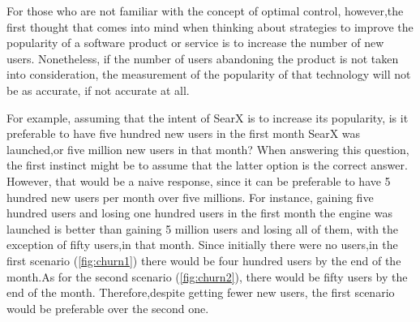 \documentclass{article}
\begin{document}
For‌‌ those ‌‌who‌‌ are‌‌ not ‌‌familiar ‌‌with‌‌ the‌‌ concept‌‌ of‌‌ optimal‌‌ control,‌‌ however,‌‌the‌‌ first ‌‌thought‌‌ that‌‌ comes‌‌ into ‌‌mind‌‌ when‌‌ thinking ‌‌about ‌‌strategies ‌‌to ‌‌improve‌‌ the ‌‌popularity‌‌ of‌‌ a‌‌ software ‌‌product‌‌ or‌ ‌service‌ ‌is‌ ‌to‌ ‌increase‌ ‌the‌ ‌number‌ ‌of‌ ‌new‌ ‌users.‌ ‌Nonetheless,‌ ‌if‌ ‌the‌ ‌number‌ ‌of‌ ‌users‌‌ abandoning‌ ‌the‌ ‌product‌ ‌is‌ ‌not‌ ‌taken‌ ‌into‌ ‌consideration,‌ ‌the‌ ‌measurement‌ ‌of‌ ‌the ‌‌popularity‌‌ of‌‌ that‌ ‌technology‌ ‌will‌ ‌not‌ ‌be‌ ‌as‌ ‌accurate, if‌ ‌not‌ ‌accurate‌ ‌at‌ ‌all.‌‌

For‌ ‌example,‌ ‌assuming‌ ‌that‌ ‌the‌ ‌intent‌ ‌of‌ ‌SearX‌ ‌is‌ ‌to ‌‌increase‌‌ its‌‌ popularity,‌‌ is‌‌ it‌‌ preferable‌‌ to‌‌ have‌‌ five‌‌ hundred‌‌ new‌‌ users‌‌ in‌‌ the‌‌ first‌‌ month‌‌ SearX‌‌ was‌‌ launched,‌‌or‌‌ five‌‌ million‌‌ new‌‌ users‌‌ in‌‌ that‌ ‌month?‌ ‌When‌ ‌answering‌ ‌this‌‌ question, ‌‌the‌‌ first‌‌ instinct‌‌ might‌‌ be‌‌ to‌‌ assume‌‌ that‌‌ the‌‌ latter‌‌ option‌ ‌is‌ ‌the‌ ‌correct‌ ‌answer.‌ ‌However,‌ ‌that‌ ‌would‌ ‌be‌ ‌a‌ ‌naive‌ ‌response,‌ ‌since‌ ‌it‌ ‌can‌ ‌be‌‌ preferable‌‌ to‌‌ have‌‌ 5‌‌ hundred‌‌ new‌‌ users‌‌ per‌‌ month‌‌ over‌‌ five‌‌ millions.‌‌ For‌‌ instance,‌‌ gaining‌‌ five‌‌ hundred‌ ‌users‌ ‌and‌ ‌losing‌ ‌one‌ ‌hundred‌ ‌users‌ ‌in‌ ‌the‌ ‌first‌ ‌month‌ ‌the‌ ‌engine‌ ‌was‌ ‌launched‌ ‌is‌‌ better‌‌ than‌‌ gaining‌‌ 5‌‌ million‌‌ users‌‌ and‌‌ losing‌‌ all‌‌ of‌‌ them,‌‌ with‌‌ the‌‌ exception‌‌ of‌‌ fifty‌‌ users,‌‌in‌‌ that‌‌ month.‌ ‌Since‌ ‌initially‌ ‌there‌ ‌were‌‌ no‌‌ users,‌‌in‌‌ the‌‌ first‌‌ scenario‌‌ (\autoref{fig:churn1})‌‌ there‌‌ would‌‌ be‌‌ four‌‌ hundred‌‌ users‌‌ by‌‌ the‌‌ end‌‌ of‌‌ the‌‌ month.‌‌As‌‌ for‌‌ the‌‌ second‌‌ scenario‌‌ (\autoref{fig:churn2}),‌‌ there‌‌ would‌‌ be‌‌ fifty‌‌ users‌‌ by‌‌ the‌‌ end‌‌ of‌‌ the‌‌ month.‌‌ Therefore,‌‌despite‌‌ getting‌‌ fewer‌‌ new‌‌ users,‌‌ the‌‌ first‌‌ scenario‌‌
would‌ ‌be‌ ‌preferable‌ ‌over‌ ‌the‌ ‌second‌ ‌one.‌‌ ‌
\end{document}
